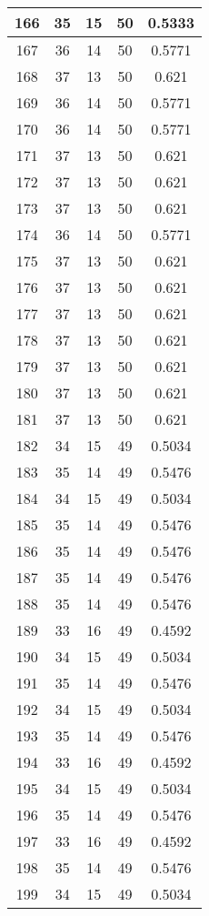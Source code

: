 \documentclass[letterpaper, 12pt]{article}
\begin{document}
\begin{longtable}{|c|c|c|c|c|}
\hline
166 & 35 & 15 & 50 & 0.5333 \\
\hline
167 & 36 & 14 & 50 & 0.5771 \\
\hline
168 & 37 & 13 & 50 & 0.621 \\
\hline
169 & 36 & 14 & 50 & 0.5771 \\
\hline
170 & 36 & 14 & 50 & 0.5771 \\
\hline
171 & 37 & 13 & 50 & 0.621 \\
\hline
172 & 37 & 13 & 50 & 0.621 \\
\hline
173 & 37 & 13 & 50 & 0.621 \\
\hline
174 & 36 & 14 & 50 & 0.5771 \\
\hline
175 & 37 & 13 & 50 & 0.621 \\
\hline
176 & 37 & 13 & 50 & 0.621 \\
\hline
177 & 37 & 13 & 50 & 0.621 \\
\hline
178 & 37 & 13 & 50 & 0.621 \\
\hline
179 & 37 & 13 & 50 & 0.621 \\
\hline
180 & 37 & 13 & 50 & 0.621 \\
\hline
181 & 37 & 13 & 50 & 0.621 \\
\hline
182 & 34 & 15 & 49 & 0.5034 \\
\hline
183 & 35 & 14 & 49 & 0.5476 \\
\hline
184 & 34 & 15 & 49 & 0.5034 \\
\hline
185 & 35 & 14 & 49 & 0.5476 \\
\hline
186 & 35 & 14 & 49 & 0.5476 \\
\hline
187 & 35 & 14 & 49 & 0.5476 \\
\hline
188 & 35 & 14 & 49 & 0.5476 \\
\hline
189 & 33 & 16 & 49 & 0.4592 \\
\hline
190 & 34 & 15 & 49 & 0.5034 \\
\hline
191 & 35 & 14 & 49 & 0.5476 \\
\hline
192 & 34 & 15 & 49 & 0.5034 \\
\hline
193 & 35 & 14 & 49 & 0.5476 \\
\hline
194 & 33 & 16 & 49 & 0.4592 \\
\hline
195 & 34 & 15 & 49 & 0.5034 \\
\hline
196 & 35 & 14 & 49 & 0.5476 \\
\hline
197 & 33 & 16 & 49 & 0.4592 \\
\hline
198 & 35 & 14 & 49 & 0.5476 \\
\hline
199 & 34 & 15 & 49 & 0.5034 \\
\hline
\end{longtable}
\end{document}
